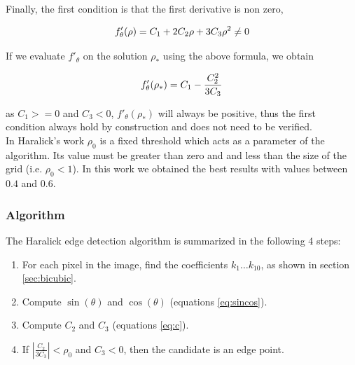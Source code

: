 \documentclass{ipol}
\numberwithin{equation}{section}
\numberwithin{table}{section}
\begin{document}
Finally,  the first condition is that the first derivative is non zero, 

\begin{equation}\label{eq:cond:first}
f'_{\theta}(\rho) = C_1 + 2C_2\rho + 3C_3\rho^2 \neq 0 \\
\end{equation}

If we evaluate $f'_{\theta}$ on the solution $\rho_*$ using the above formula, we obtain

\begin{equation}\label{eq:cond:first:optim}
f'_{\theta}(\rho_*) = C_1 - \frac{C_2^2}{3C_3}  \\
\end{equation}

as $C_1>=0$ and $C_3<0$, $f'_{\theta}(\rho_*)$ will always be positive, thus the first condition always hold by construction and does not need to be verified.\\

In Haralick's work $\rho_0$ is a fixed threshold which acts as a parameter of the algorithm.
Its value must be greater than zero and and less than the size of the grid (i.e. $\rho_0<1$). In this work we obtained the best results with values between $0.4$ and $0.6$.\\


\subsubsection{Algorithm}

The Haralick edge detection algorithm is summarized in the following 4 steps:

\begin{enumerate}
	\item For each pixel in the image, find the coefficients $k_1 \hdots k_{10}$, as shown in section \ref{sec:bicubic}.
	\item Compute $\sin(\theta)$ and $\cos(\theta)$ (equations \ref{eq:sincos}).
	\item Compute $C_2$ and $C_3$ (equations \ref{eq:c}).
	\item If $\left| \frac{C_2}{3C_3} \right| < \rho_0$ and $C_3 < 0$, then the candidate is an edge point.
\end{enumerate}

\end{document}
